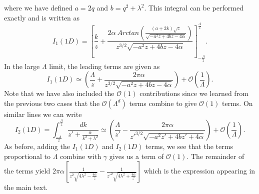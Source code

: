 \documentclass[prl,aps,twocolumn,groupaddress]{revtex4-1}
\begin{document}
where we have defined $a=2q$ and $b=q^2 + \lambda^2$. This integral can be performed exactly and is written as
\begin{equation}
I_1(1D) = \left[\frac{k}{z} +  \frac{2 \alpha~Arctan\left(\frac{(a+ 2 k)\sqrt{z}}{\sqrt{-a^2 z + 4 b z - 4 \alpha}}\right)}{z^{3/2}\sqrt{-a^2 z + 4 b z - 4 \alpha}}\right]_{-\frac{\Lambda}{2}}^{\frac{\Lambda}{2}}.
\end{equation}
In the large $\Lambda$ limit, the leading terms are given as
\begin{equation}
I_1(1D) \simeq \left( \frac{\Lambda}{z} + \frac{2 \pi \alpha}{z^{3/2} \sqrt{-a^2 z + 4 b z - 4 \alpha}}\right)+  \mathscr{O}(\frac{1}{\Lambda}).
\end{equation}
Note that we have also included the $\mathscr{O}(1)$ contributions since we learned from the previous two cases that the $\mathscr{O}(\Lambda^d)$ terms combine to give $\mathscr{O}(1)$ terms. On similar lines we can write
\begin{equation}
I_2(1D) = \int_{\frac{-\Lambda}{2}}^{\frac{\Lambda}{2}} \frac{dk}{z' + \frac{\alpha}{k^2 + \lambda^2}} \simeq \left( \frac{\Lambda}{z'} - \frac{2 \pi \alpha}{z'^{3/2} \sqrt{-a^2 z' + 4 b z' + 4 \alpha}}\right)+  \mathscr{O}(\frac{1}{\Lambda}).
\end{equation}
As before, adding the $I_1(1D)$ and $I_2(1D)$ terms, we see that the terms proportional to $\Lambda$ combine with $\gamma$ gives us a term of $\mathscr{O}(1)$. The remainder of the terms yield $2 \pi \alpha \left[\frac{1}{z^2 \sqrt{4 \lambda^2 - \frac{4\alpha}{z}}} - \frac{1}{z'^2 \sqrt{4 \lambda^2 + \frac{4\alpha}{z'}}} \right]$ which is the expression appearing in the main text.
\end{document}
